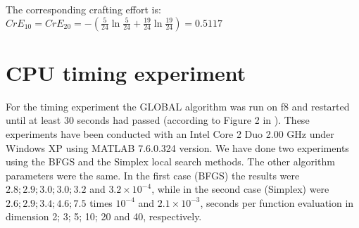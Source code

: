 \documentclass{sig-alternate}
\begin{document}
The corresponding crafting effort is: $CrE_{10}=CrE_{20}=-(\frac{5}{24}\ln\frac{5}{24}+\frac{19}{24}\ln\frac{19}{24})=0.5117$

\section{CPU timing experiment}

For the timing experiment the GLOBAL algorithm
was run on f8 and restarted until at least 30 seconds had
passed (according to Figure 2 in \cite{hansen2009exp}). These experiments
have been conducted with an Intel
Core 2 Duo 2.00 GHz under Windows XP using MATLAB 7.6.0.324 version. We have done two experiments using the BFGS and the Simplex local search methods. The other algorithm parameters were the same. In the first case (BFGS) the results were $2.8; 2.9; 3.0; 3.0; 3.2$ and $3.2 {\times} 10^{-4}$, while in the second case (Simplex) were $2.6; 2.9; 3.4; 4.6; 7.5$ times $10^{-4}$ and $2.1 {\times} 10^{-3}$,
seconds per function evaluation in dimension 2; 3; 5; 10; 20
and 40, respectively.



\end{document}
